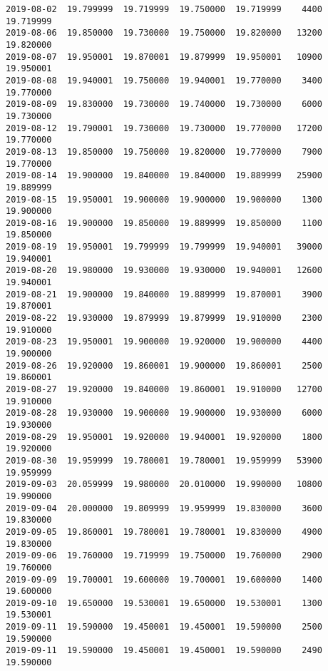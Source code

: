 \documentclass[11pt]{article}
\begin{document}
\begin{Verbatim}[commandchars=\\\{\}]
2019-08-02  19.799999  19.719999  19.750000  19.719999    4400  19.719999
2019-08-06  19.850000  19.730000  19.750000  19.820000   13200  19.820000
2019-08-07  19.950001  19.870001  19.879999  19.950001   10900  19.950001
2019-08-08  19.940001  19.750000  19.940001  19.770000    3400  19.770000
2019-08-09  19.830000  19.730000  19.740000  19.730000    6000  19.730000
2019-08-12  19.790001  19.730000  19.730000  19.770000   17200  19.770000
2019-08-13  19.850000  19.750000  19.820000  19.770000    7900  19.770000
2019-08-14  19.900000  19.840000  19.840000  19.889999   25900  19.889999
2019-08-15  19.950001  19.900000  19.900000  19.900000    1300  19.900000
2019-08-16  19.900000  19.850000  19.889999  19.850000    1100  19.850000
2019-08-19  19.950001  19.799999  19.799999  19.940001   39000  19.940001
2019-08-20  19.980000  19.930000  19.930000  19.940001   12600  19.940001
2019-08-21  19.900000  19.840000  19.889999  19.870001    3900  19.870001
2019-08-22  19.930000  19.879999  19.879999  19.910000    2300  19.910000
2019-08-23  19.950001  19.900000  19.920000  19.900000    4400  19.900000
2019-08-26  19.920000  19.860001  19.900000  19.860001    2500  19.860001
2019-08-27  19.920000  19.840000  19.860001  19.910000   12700  19.910000
2019-08-28  19.930000  19.900000  19.900000  19.930000    6000  19.930000
2019-08-29  19.950001  19.920000  19.940001  19.920000    1800  19.920000
2019-08-30  19.959999  19.780001  19.780001  19.959999   53900  19.959999
2019-09-03  20.059999  19.980000  20.010000  19.990000   10800  19.990000
2019-09-04  20.000000  19.809999  19.959999  19.830000    3600  19.830000
2019-09-05  19.860001  19.780001  19.780001  19.830000    4900  19.830000
2019-09-06  19.760000  19.719999  19.750000  19.760000    2900  19.760000
2019-09-09  19.700001  19.600000  19.700001  19.600000    1400  19.600000
2019-09-10  19.650000  19.530001  19.650000  19.530001    1300  19.530001
2019-09-11  19.590000  19.450001  19.450001  19.590000    2500  19.590000
2019-09-11  19.590000  19.450001  19.450001  19.590000    2490  19.590000


\end{Verbatim}
\end{document}
